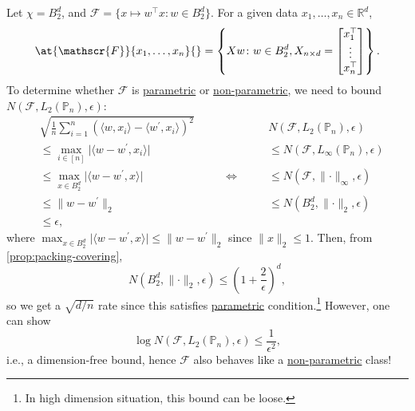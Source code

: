 \begin{eg}
	Let \(\chi = B_2^d\), and \(\mathscr{F} = \{ x \mapsto w^{\top} x \colon w\in B_2^d \} \). For a given data \(x_1, \dots , x_n \in \mathbb{R} ^d\),
	\[
		\at{\mathscr{F}}{x_1, \dots , x_n}{} = \left\{ X w \colon w\in B_2^d, X_{n \times d} = \begin{bmatrix}
			x_1 ^{\top} \\
			\vdots      \\
			x_n ^{\top} \\
		\end{bmatrix} \right\}.
	\]
	To determine whether \(\mathscr{F} \) is \hyperref[def:parametric]{parametric} or \hyperref[def:non-parametric]{non-parametric}, we need to bound \(N(\mathscr{F} , L_2(\mathbb{P} _n), \epsilon )\):
	\[
		\begin{alignedat}{4}
			& \sqrt{\frac{1}{n}\sum_{i=1}^{n} \left( \langle w, x_i \rangle - \langle w^{\prime} , x_i \rangle \right) ^2 } &                    & N(\mathscr{F} , L_2(\mathbb{P} _n), \epsilon )                \\
			& \leq \max _{i\in[n]} \vert \langle w-w^{\prime} , x_i \rangle \vert                                           &                    & \leq N(\mathscr{F} , L_\infty (\mathbb{P} _n), \epsilon )     \\
			& \leq \max _{x\in B_2^d} \vert \langle w - w^{\prime} , x \rangle  \vert                                       & \qquad \iff \qquad & \leq N(\mathscr{F} , \lVert \cdot \rVert _\infty , \epsilon ) \\
			& \leq \lVert w - w^{\prime} \rVert _2                                                                          &                    & \leq N(B_2^d, \lVert \cdot \rVert _2, \epsilon )              \\
			& \leq \epsilon,                                                                                                &                    &
		\end{alignedat}
	\]
	where \(\max _{x\in B_2^d} \vert \langle w - w^{\prime} , x \rangle \vert \leq \lVert w - w^{\prime}  \rVert _2\) since \(\lVert x \rVert _2 \leq 1\). Then, from \autoref{prop:packing-covering},
	\[
		N(B_2^d, \lVert \cdot \rVert _2, \epsilon )
		\leq \left( 1 + \frac{2}{\epsilon } \right)^d,
	\]
	so we get a \(\sqrt{d / n} \) rate since this satisfies \hyperref[def:parametric]{parametric} condition.\footnote{In high dimension situation, this bound can be loose.} However, one can show
	\[
		\log N(\mathscr{F} , L_2(\mathbb{P} _n), \epsilon ) \leq \frac{1}{\epsilon ^2},
	\]
	i.e., a dimension-free bound, hence \(\mathscr{F} \) also behaves like a \hyperref[def:non-parametric]{non-parametric} class!
\end{eg}

